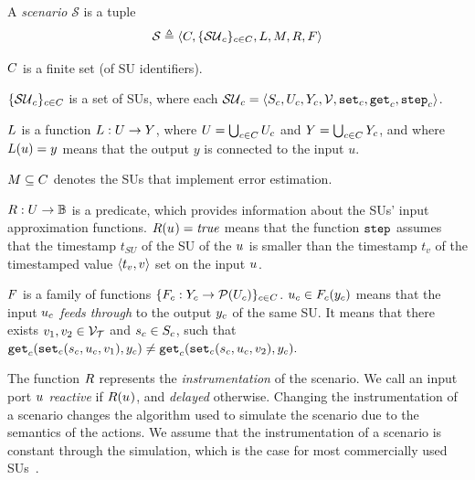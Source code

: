 \begin{definition}[Scenario]\label{def:cosim_scenario}
  A \emph{scenario} $\mathcal{S}$ is a tuple $$\mathcal{S} \triangleq  \left\langle C, \{\mathcal{SU}_c\}_{c \in C}, L, M, R, F \right\rangle $$
  \begin{compactitem}
    \item $C$ is a finite set (of SU identifiers). 
    \item $\{\mathcal{SU}_c\}_{c \in C}$ is a set of SUs, where each $\mathcal{SU}_c =  \left\langle S_{c}, U_{c}, Y_{c}, \mathcal{V}, \mathtt{set}_{c}, \mathtt{get}_{c}, \mathtt{step}_{c} \right\rangle $.
    \item
    $L$ is a function $L : U \to Y$, where $U = \bigcup_{c \in C} U_{c}$ and $Y = \bigcup_{c \in C} Y_{c}$, and where 
    $L(u)=y$ means that the output $y$ is connected to the input $u$.   
    \item $M \subseteq C$ denotes the SUs that implement error estimation. 
    \item
    $R : U \to \mathbb{B}$ is a predicate, which provides information about the SUs' input approximation functions.
    $R(u_{}) = \mathit{true}$ means that the function $\mathtt{step}_{}$ assumes that the timestamp $t_{SU}$ of the SU of the $u_{}$ is smaller than the timestamp $t_v$ of the timestamped value $ \left\langle t_v,v \right\rangle $ set on the input $u_{}$.
    \item $F$ is a family of functions $\{F_{c} : Y_{c} \to \mathcal{P}(U_{c})\}_{c \in C}$.
    $u_{c} \in F_{c}(y_{c})$ means that the input $u_{c}$ \emph{feeds through} to the output $y_{c}$ of the same SU.
    It means that there exists $v_1, v_2 \in \mathcal{V_{T}}$ and $s_{c} \in S_{c}$, such that
    $\mathtt{get}_{c} (\mathtt{set}_{c}(s_{c}, u_{c}, v_1), y_{c}) \neq \mathtt{get}_{c} (\mathtt{set}_{c}(s_{c}, u_{c}, v_2), y_{c}).$
  \end{compactitem}
\end{definition}

The function $R$ represents the \emph{instrumentation} of the scenario.
We call an input port $u_{}$ \emph{reactive} if $R(u_{})$, and \emph{delayed} otherwise. 
Changing the instrumentation of a scenario changes the algorithm used to simulate the scenario due to the semantics of the actions.
We assume that the instrumentation of a scenario is constant through the simulation, which is the case for most commercially used SUs~\cite{Gomes2018a}.

